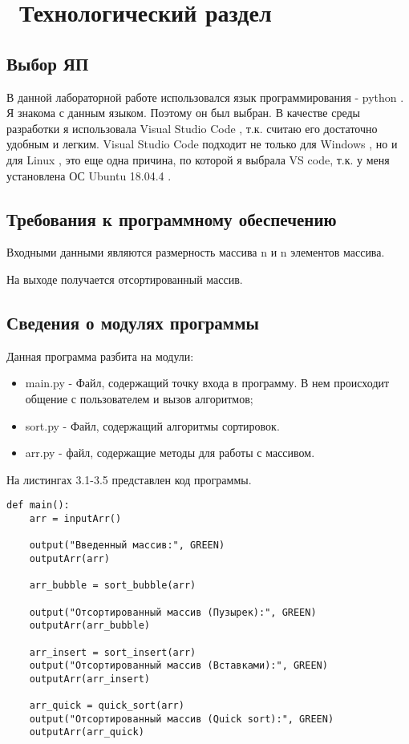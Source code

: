 \chapter{ Технологический раздел}
\label{cha:design}

\section{Выбор ЯП}

В данной лабораторной работе использовался язык программирования - python \cite{bib1}.
Я знакома с данным языком.
Поэтому он был выбран. 
В качестве среды разработки я использовала Visual Studio Code \cite{bib2}, т.к. считаю его достаточно удобным и легким.
Visual Studio Code подходит не только для  Windows \cite{bib3}, но и для Linux \cite{bib4}, это еще одна причина, по которой я выбрала VS code, т.к. у меня установлена ОС Ubuntu 18.04.4 \cite{bib5}.

\section{Требования к программному обеспечению}

Входными данными являются размерность массива n и n элементов массива.

На выходе получается отсортированный массив.

\section{Сведения о модулях программы}

Данная программа разбита на модули:

\begin{itemize}
	\item main.py - Файл, содержащий точку входа в программу. В нем происходит общение с пользователем и вызов алгоритмов;
	\item sort.py - Файл, содержащий алгоритмы сортировок.
	\item arr.py - файл, содержащие методы для работы с массивом.
\end{itemize}

На листингах 3.1-3.5 представлен код программы.

\begin{lstlisting}[label=some-code,caption=Главная функция main]
def main():
	arr = inputArr()

	output("Введенный массив:", GREEN)
	outputArr(arr)

	arr_bubble = sort_bubble(arr)

	output("Отсортированный массив (Пузырек):", GREEN)
	outputArr(arr_bubble)

	arr_insert = sort_insert(arr)
	output("Отсортированный массив (Вставками):", GREEN)
	outputArr(arr_insert)

	arr_quick = quick_sort(arr)
	output("Отсортированный массив (Quick sort):", GREEN)
	outputArr(arr_quick)
\end{lstlisting}

